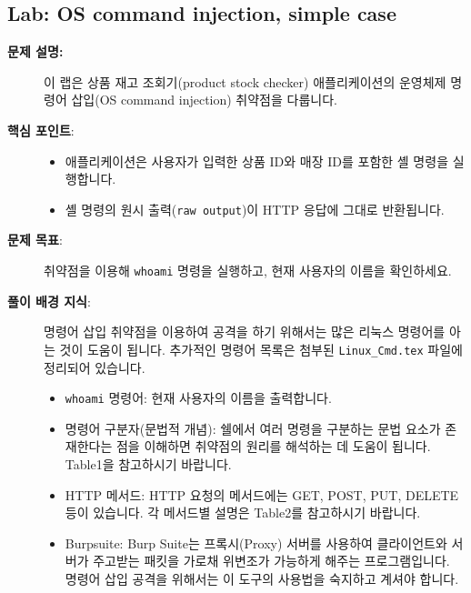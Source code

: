 \documentclass{article}
\begin{document}
\subsection*{Lab: OS command injection, simple case}
\begin{description}
  \item[\textbf{문제 설명:}] 이 랩은 상품 재고 조회기(product stock checker) 애플리케이션의 운영체제 명령어 삽입(OS command injection) 취약점을 다룹니다.
  \item[\textbf{핵심 포인트}:]\leavevmode\par
    \begin{itemize}
      \item 애플리케이션은 사용자가 입력한 상품 ID와 매장 ID를 포함한 셸 명령을 실행합니다.
      \item 셸 명령의 원시 출력(\texttt{raw output})이 HTTP 응답에 그대로 반환됩니다.
    \end{itemize}
  \item [\textbf{문제 목표}:] 취약점을 이용해 \texttt{whoami} 명령을 실행하고, 현재 사용자의 이름을 확인하세요.
  \item[\textbf{풀이 배경 지식}:]\leavevmode\par
    명령어 삽입 취약점을 이용하여 공격을 하기 위해서는 많은 리눅스 명령어를 아는 것이 도움이 됩니다. 추가적인 명령어 목록은 첨부된 \texttt{Linux\_Cmd.tex} 파일에 정리되어 있습니다.
    \begin{itemize}
      \item \texttt{whoami} 명령어: 현재 사용자의 이름을 출력합니다.
      \item 명령어 구분자(문법적 개념): 쉘에서 여러 명령을 구분하는 문법 요소가 존재한다는 점을 이해하면 취약점의 원리를 해석하는 데 도움이 됩니다. Table1을 참고하시기 바랍니다.
      \item HTTP 메서드: HTTP 요청의 메서드에는 GET, POST, PUT, DELETE 등이 있습니다. 각 메서드별 설명은 Table2를 참고하시기 바랍니다.
      \item Burpsuite: Burp Suite는 프록시(Proxy) 서버를 사용하여 클라이언트와 서버가 주고받는 패킷을 가로채 위변조가 가능하게 해주는 프로그램입니다. 명령어 삽입 공격을 위해서는 이 도구의 사용법을 숙지하고 계셔야 합니다. 
    \end{itemize}

      \begin{center}
        \label{tab:shell-ops-extended}
        \vspace{0.5em}


\end{center}
\end{description}
\end{document}
